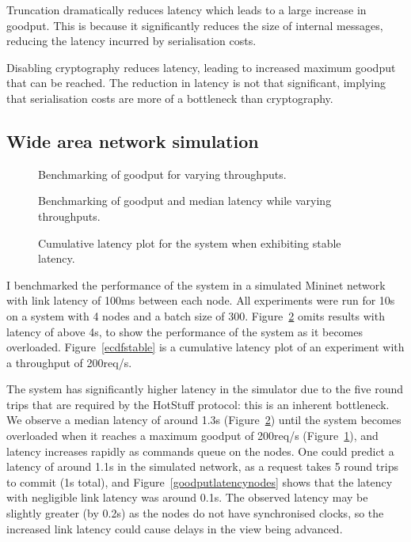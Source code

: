 Truncation dramatically reduces latency which leads to a large increase in goodput. This is because it significantly reduces the size of internal messages, reducing the latency incurred by serialisation costs.

Disabling cryptography reduces latency, leading to increased maximum goodput that can be reached. The reduction in latency is not that significant, implying that serialisation costs are more of a bottleneck than cryptography.

\subsection{Wide area network simulation} \label{minineteval}

\begin{figure}[h!]
\centering
\resizebox{.6\textwidth}{!}{}
\caption{Benchmarking of goodput for varying throughputs.}
\label{throughoutgoodputmininet}
\end{figure}

\begin{figure}[h!]
\centering
\resizebox{.5\textwidth}{!}{}
\caption{Benchmarking of goodput and median latency while varying throughputs.}
\label{goodputlatencymininet}
\end{figure}

\begin{figure}[h!]
\centering
\resizebox{.6\textwidth}{!}{}
\caption{Cumulative latency plot for the system when exhibiting stable latency.}
\label{ecdfmininet}
\end{figure}

I benchmarked the performance of the system in a simulated Mininet network \cite{mininet,lantzNetworkLaptopRapid2010} with link latency of 100ms between each node. All experiments were run for 10s on a system with 4 nodes and a batch size of 300. Figure~\ref{goodputlatencymininet} omits results with latency of above 4s, to show the performance of the system as it becomes overloaded. Figure~\ref{ecdfstable} is a cumulative latency plot of an experiment with a throughput of 200req/s.

The system has significantly higher latency in the simulator due to the five round trips that are required by the HotStuff protocol: this is an inherent bottleneck. We observe a median latency of around 1.3s (Figure~\ref{goodputlatencymininet}) until the system becomes overloaded when it reaches a maximum goodput of 200req/s (Figure~\ref{throughoutgoodputmininet}), and latency increases rapidly as commands queue on the nodes. One could predict a latency of around 1.1s in the simulated network, as a request takes 5 round trips to commit (1s total), and Figure~\ref{goodputlatencynodes} shows that the latency with negligible link latency was around 0.1s. The observed latency may be slightly greater (by 0.2s) as the nodes do not have synchronised clocks, so the increased link latency could cause delays in the view being advanced.

